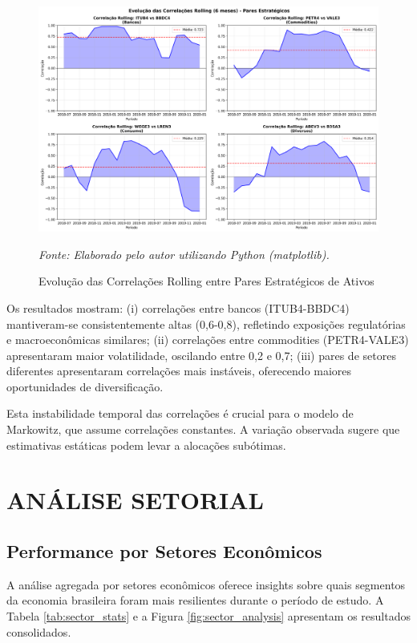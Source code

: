 \begin{figure}[H]
\centering
\includegraphics[width=\textwidth]{images/correlation_evolution.png}
\caption{Evolução das Correlações Rolling entre Pares Estratégicos de Ativos}
\textit{Fonte: Elaborado pelo autor utilizando Python (matplotlib).}
\label{fig:correlation_evolution}
\end{figure}

Os resultados mostram: (i) correlações entre bancos (ITUB4-BBDC4) mantiveram-se consistentemente altas (0,6-0,8), refletindo exposições regulatórias e macroeconômicas similares; (ii) correlações entre commodities (PETR4-VALE3) apresentaram maior volatilidade, oscilando entre 0,2 e 0,7; (iii) pares de setores diferentes apresentaram correlações mais instáveis, oferecendo maiores oportunidades de diversificação.

Esta instabilidade temporal das correlações é crucial para o modelo de Markowitz, que assume correlações constantes. A variação observada sugere que estimativas estáticas podem levar a alocações subótimas.

\section{ANÁLISE SETORIAL}

\subsection{Performance por Setores Econômicos}

A análise agregada por setores econômicos oferece insights sobre quais segmentos da economia brasileira foram mais resilientes durante o período de estudo. A Tabela \ref{tab:sector_stats} e a Figura \ref{fig:sector_analysis} apresentam os resultados consolidados.

